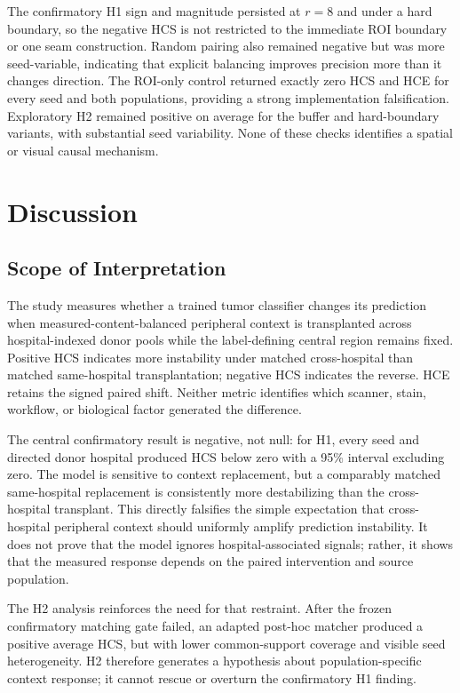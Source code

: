 \documentclass[notspecified,article,submit,moreauthors]{Definitions/mdpi}
\begin{document}
The confirmatory H1 sign and magnitude persisted at $r=8$ and under a hard
boundary, so the negative HCS is not restricted to the immediate ROI boundary
or one seam construction. Random pairing also remained negative but was more
seed-variable, indicating that explicit balancing improves precision more
than it changes direction. The ROI-only control returned exactly zero HCS and
HCE for every seed and both populations, providing a strong implementation
falsification. Exploratory H2 remained positive on average for the buffer and
hard-boundary variants, with substantial seed variability. None of these
checks identifies a spatial or visual causal mechanism.

\section{Discussion}

\subsection{Scope of Interpretation}

The study measures whether a trained tumor classifier changes its prediction
when measured-content-balanced peripheral context is transplanted across
hospital-indexed donor pools while the label-defining central region remains
fixed. Positive HCS indicates more instability under matched cross-hospital
than matched same-hospital transplantation; negative HCS indicates the
reverse. HCE retains the signed paired shift. Neither metric identifies which
scanner, stain, workflow, or biological factor generated the difference.

The central confirmatory result is negative, not null: for H1, every seed and
directed donor hospital produced HCS below zero with a 95\% interval excluding
zero. The model is sensitive to context replacement, but a comparably matched
same-hospital replacement is consistently more destabilizing than the
cross-hospital transplant. This directly falsifies the simple expectation
that cross-hospital peripheral context should uniformly amplify prediction
instability. It does not prove that the model ignores hospital-associated
signals; rather, it shows that the measured response depends on the paired
intervention and source population.

The H2 analysis reinforces the need for that restraint. After the frozen
confirmatory matching gate failed, an adapted post-hoc matcher produced a
positive average HCS, but with lower common-support coverage and visible seed
heterogeneity. H2 therefore generates a hypothesis about population-specific
context response; it cannot rescue or overturn the confirmatory H1 finding.
\end{document}
